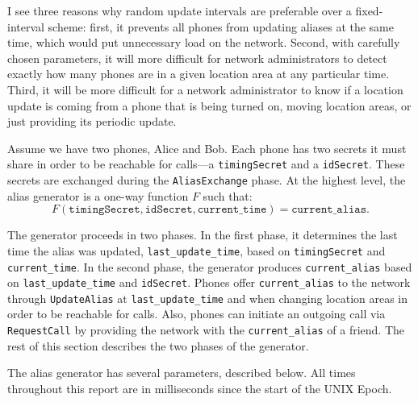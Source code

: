 \documentclass[11pt]{article}
\begin{document}
I see three reasons why random update intervals are preferable over a fixed-interval scheme: first, it prevents all phones from updating aliases at the same time, which would put unnecessary load on the network. Second, with carefully chosen parameters, it will more difficult for network administrators to detect exactly how many phones are in a given location area at any particular time. Third, it will be more difficult for a network administrator to know if a location update is coming from a phone that is being turned on, moving location areas, or just providing its periodic update. 

Assume we have two phones, Alice and Bob. Each phone has two secrets it must share in order to be reachable for calls---a \texttt{timingSecret} and a \texttt{idSecret}. These secrets are exchanged during the \texttt{AliasExchange} phase. At the highest level, the alias generator is a one-way function $F$ such that:
\begin{equation*}
	F(\texttt{timingSecret}, \texttt{idSecret}, \texttt{current_time}) = \texttt{current_alias}.
\end{equation*}

The generator proceeds in two phases. In the first phase, it determines the last time the alias was updated, \texttt{last_update_time}, based on \texttt{timingSecret} and \texttt{current_time}. In the second phase, the generator produces \texttt{current_alias} based on \texttt{last_update_time} and \texttt{idSecret}. Phones offer \texttt{current_alias} to the network through \texttt{UpdateAlias} at \texttt{last_update_time} and when changing location areas in order to be reachable for calls. Also, phones can initiate an outgoing call via \texttt{RequestCall} by providing the network with the \texttt{current_alias} of a friend. The rest of this section describes the two phases of the generator.

The alias generator has several parameters, described below. All times throughout this report are in milliseconds since the start of the UNIX Epoch.
\end{document}
